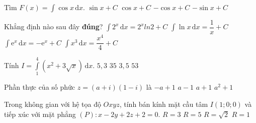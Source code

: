 \begin{ex}%
	Tìm $F(x)=\displaystyle\int \cos x\mathrm{\,d}x$.
	\choice
	{\True $\sin x +C$}
	{$\cos x +C$}
	{$-\cos x+C$}
	{$-\sin x +C$}
\end{ex}
\begin{ex}%
	Khẳng định nào sau đây \textbf{đúng}?
	\choice
	{$\displaystyle\int 2^x\mathrm{\,d}x=2^xln2+C$}
	{$\displaystyle\int \ln x\mathrm{\,d}x=\dfrac{1}{x}+C$}
	{$\displaystyle\int \mathrm{e}^x\mathrm{\,d}x=-\mathrm{e}^x+C$}
	{\True $\displaystyle\int x^3\mathrm{\,d}x=\dfrac{x^4}{4}+C$}
\end{ex}
\begin{ex}%
	Tính $I=\displaystyle\int\limits_1^4\left(x^2+3\sqrt{x}\right)\mathrm{\,d}x$.
	\choice
	{$5{,}3$}
	{\True $35$}
	{$3{,}5$}
	{$53$}
\end{ex}
\begin{ex}%
	Phần thực của số phức $z=(a+i)(1-i)$ là
	\choice
	{$-a+1$}
	{$a-1$}
	{\True $a+1$}
	{$a^2+1$}
\end{ex}
\begin{ex}%
	Trong không gian với hệ tọa độ $Oxyz$, tính bán kính mặt cầu tâm $I\left(1;0;0\right)$ và tiếp xúc với mặt phẳng $\left(P\right)\colon x-2y+2z+2=0$.
	\choice
	{$R=3$}
	{$R=5$}
	{$R=\sqrt{2}$}
	{\True $R=1$}
\end{ex}
